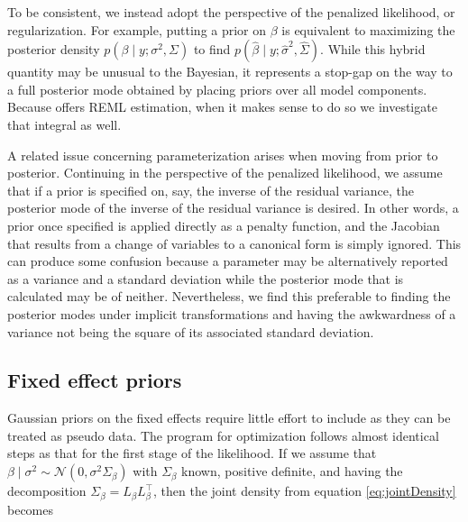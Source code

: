 \documentclass[article,shortnames]{jss}
\begin{document}
To be consistent, we instead adopt the perspective of the penalized
likelihood, or regularization. For example, putting a prior on $\beta$
is equivalent to maximizing the posterior density
$p(\beta \mid y; \sigma^2, \Sigma)$ to find $p(\hat{\beta} \mid y;
\hat{\sigma}^2, \hat{\Sigma})$. While this hybrid quantity may be unusual to the
Bayesian, it represents a stop-gap on the way to a full posterior mode
obtained by placing priors over all model components. Because
 offers REML estimation, when it makes sense to do so we
investigate that integral as well.

A related issue concerning parameterization arises when
moving from prior to posterior. Continuing in the perspective of the
penalized likelihood, we assume that if a prior is specified on, say, the inverse of the residual variance,
the posterior mode of the inverse of the residual variance is desired. In
other words, a prior once specified is applied directly as a penalty
function, and the Jacobian that results from a change of
variables to a canonical form is simply ignored. This can
produce some confusion because a parameter may be alternatively
reported as a variance and a standard deviation while the posterior
mode that is calculated may be of neither. Nevertheless, we find this
preferable to finding the posterior modes under implicit transformations and having the awkwardness
of a variance not being the square of its associated standard deviation.

\subsection{Fixed effect priors}
\label{sec:bmath:fixefPrior}

Gaussian priors on the fixed effects require little effort to include
as they can be treated as pseudo data. The program for optimization follows
almost identical steps as that for the first stage of the
likelihood. If we assume that $\beta \mid \sigma^2 \sim
\mathcal{N}(0, \sigma^2\Sigma_\beta)$ with $\Sigma_\beta$ known,
positive definite, and
having the decomposition $\Sigma_\beta = L_\beta L_\beta^\top$, then
the joint density from equation \ref{eq:jointDensity} becomes
\end{document}
